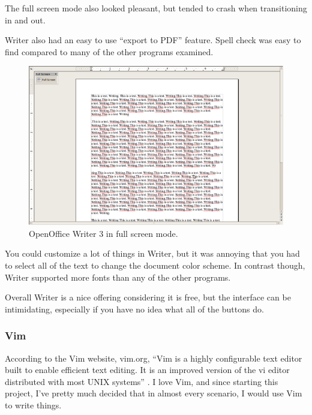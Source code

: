 \documentclass[10pt]{article}
\begin{document}
The full screen mode also looked pleasant, but tended to crash when transitioning in and out.

Writer also had an easy to use ``export to PDF'' feature. Spell check was easy to find compared to many of the other programs examined.

\begin{figure}
   \centering
      \includegraphics[width=130mm]{images/oo3.png}
   \caption{OpenOffice Writer 3 in full screen mode.}
\end{figure}

You could customize a lot of things in Writer, but it was annoying that you had to select all of the text to change the document color scheme. In contrast though, Writer supported more fonts than any of the other programs.

Overall Writer is a nice offering considering it is free, but the interface can be intimidating, especially if you have no idea what all of the buttons do.

\subsubsection{Vim}

According to the Vim website, vim.org, ``Vim is a highly configurable text editor built to enable efficient text editing. It is an improved version of the vi editor distributed with most UNIX systems'' \cite{vimabout}. I love Vim, and since starting this project, I've pretty much decided that in almost every scenario, I would use Vim to write things.
\end{document}
